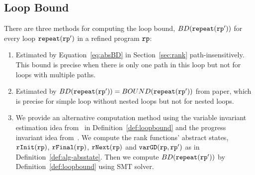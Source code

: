 
\subsection{Loop Bound}
There are three methods for computing the loop bound, $BD(\mathtt{repeat}(\mathtt{rp}'))$ for every loop $\mathtt{repeat}(\mathtt{rp}')$ in a refined program $\mathtt{rp}$:
\begin{enumerate}
  \item Estimated by Equation~\ref{eq:absBD} in Section~\ref{sec:rank} path-insensitively. This bound is precise when there is only one path in this loop but not for loops with multiple paths.
  \item Estimated by $BD(\mathtt{repeat}(\mathtt{rp}')) = BOUND(\mathtt{repeat}(\mathtt{rp}'))$ from paper\cite{GulwaniJK09}, which is precise for simple loop without nested loops but not for nested loops. 
  \item   We provide an alternative computation method using the variable invariant estimation idea from~\cite{sinn2017complexity} in Definition~\ref{def:loopbound} and the progress invariant idea from~\cite{GulwaniJK09}.
  We compute the rank functions' abstract states, $\mathtt{rInit}(\mathtt{rp})$, $\mathtt{rFinal}(\mathtt{rp})$, $\mathtt{rNext}(\mathtt{rp})$ and $\mathtt{varGD}(\mathtt{rp}, \mathtt{rp}')$ as in Definition~\ref{def:alg-absstate}.
  Then we compute $BD(\mathtt{repeat}(\mathtt{rp}'))$ by Definition~\ref{def:loopbound} using SMT solver.
\end{enumerate}
%
